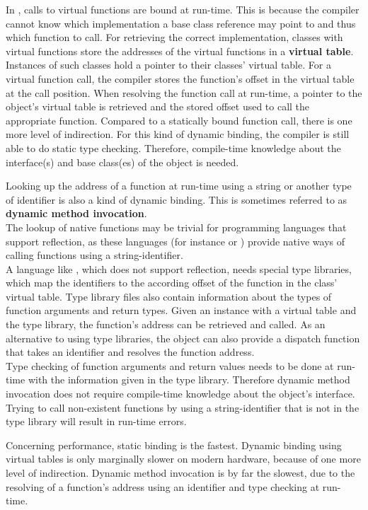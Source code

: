 In , calls to virtual functions are bound at run-time. This is because the compiler cannot know which implementation a base class reference may point to and thus which function to call. For retrieving the correct implementation, classes with virtual functions store the addresses of the virtual functions in a \textbf{virtual table}. Instances of such classes hold a pointer to their classes' virtual table. For a virtual function call, the compiler stores the function's offset in the virtual table at the call position. When resolving the function call at run-time, a pointer to the object's virtual table is retrieved and the stored offset used to call the appropriate function. Compared to a statically bound function call, there is one more level of indirection. For this kind of dynamic binding, the compiler is still able to do static type checking. Therefore, compile-time knowledge about the interface(s) and base class(es) of the object is needed. 

Looking up the address of a function at run-time using a string or another type of identifier is also a kind of dynamic binding. This is sometimes referred to as \textbf{dynamic method invocation}.\\
The lookup of native functions may be trivial for programming languages that support reflection, as these languages (for instance  or ) provide native ways of calling functions using a string-identifier.\\
A language like , which does not support reflection, needs special type libraries, which map the identifiers to the according offset of the function in the class' virtual table. Type library files also contain information about the types of function arguments and return types. Given an instance with a virtual table and the type library, the function's address can be retrieved and called. As an alternative to using type libraries, the object can also provide a dispatch function that takes an identifier and resolves the function address.
\\Type checking of function arguments and return values needs to be done at run-time with the information given in the type library. Therefore dynamic method invocation does not require compile-time knowledge about the object's interface. Trying to call non-existent functions by using a string-identifier that is not in the type library will result in run-time errors.

Concerning performance, static binding is the fastest. Dynamic binding using virtual tables is only marginally slower on modern hardware, because of one more level of indirection. Dynamic method invocation is by far the slowest, due to the resolving of a function's address using an identifier and type checking at run-time. 

